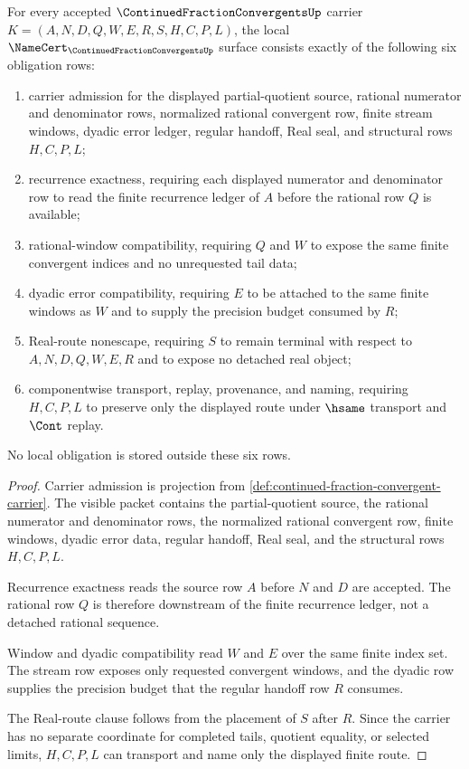 \begin{theorem}
\label{thm:continued-fraction-convergent-namecert-obligations}
For every accepted $\ContinuedFractionConvergentsUp$ carrier
$K=(A,N,D,Q,W,E,R,S,H,C,P,L)$, the local
$\NameCert_{\ContinuedFractionConvergentsUp}$ surface consists exactly of the
following six obligation rows:
\begin{enumerate}
\item carrier admission for the displayed partial-quotient source, rational
numerator and denominator rows, normalized rational convergent row, finite
stream windows, dyadic error ledger, regular handoff, Real seal, and
structural rows $H,C,P,L$;
\item recurrence exactness, requiring each displayed numerator and denominator
row to read the finite recurrence ledger of $A$ before the rational row $Q$
is available;
\item rational-window compatibility, requiring $Q$ and $W$ to expose the same
finite convergent indices and no unrequested tail data;
\item dyadic error compatibility, requiring $E$ to be attached to the same
finite windows as $W$ and to supply the precision budget consumed by $R$;
\item Real-route nonescape, requiring $S$ to remain terminal with respect to
$A,N,D,Q,W,E,R$ and to expose no detached real object;
\item componentwise transport, replay, provenance, and naming, requiring
$H,C,P,L$ to preserve only the displayed route under $\hsame$ transport and
$\Cont$ replay.
\end{enumerate}
No local obligation is stored outside these six rows.
\end{theorem}
\begin{proof}
Carrier admission is projection from
\autoref{def:continued-fraction-convergent-carrier}. The visible packet
contains the partial-quotient source, the rational numerator and denominator
rows, the normalized rational convergent row, finite windows, dyadic error
data, regular handoff, Real seal, and the structural rows $H,C,P,L$.

Recurrence exactness reads the source row $A$ before $N$ and $D$ are accepted.
The rational row $Q$ is therefore downstream of the finite recurrence ledger,
not a detached rational sequence.

Window and dyadic compatibility read $W$ and $E$ over the same finite index
set. The stream row exposes only requested convergent windows, and the dyadic
row supplies the precision budget that the regular handoff row $R$ consumes.

The Real-route clause follows from the placement of $S$ after $R$. Since the
carrier has no separate coordinate for completed tails, quotient equality, or
selected limits, $H,C,P,L$ can transport and name only the displayed finite
route.
\end{proof}

